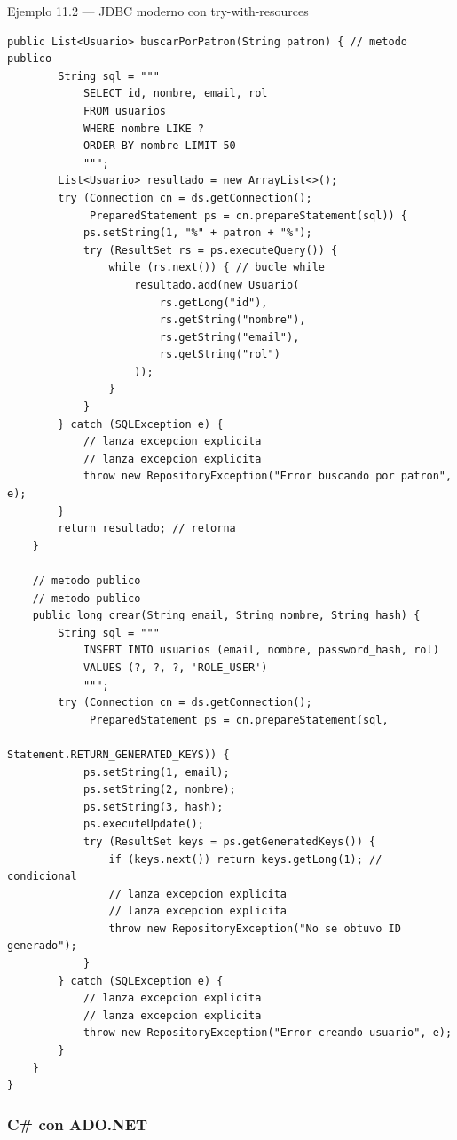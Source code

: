 \begin{cajaejemplo}{Ejemplo 11.2 --- JDBC moderno con try-with-resources}
\begin{lstlisting}[style=java,caption={UsuarioJdbcRepository.java},label=lst:11.5]
    public List<Usuario> buscarPorPatron(String patron) { // metodo publico
        String sql = """
            SELECT id, nombre, email, rol
            FROM usuarios
            WHERE nombre LIKE ?
            ORDER BY nombre LIMIT 50
            """;
        List<Usuario> resultado = new ArrayList<>();
        try (Connection cn = ds.getConnection();
             PreparedStatement ps = cn.prepareStatement(sql)) {
            ps.setString(1, "%" + patron + "%");
            try (ResultSet rs = ps.executeQuery()) {
                while (rs.next()) { // bucle while
                    resultado.add(new Usuario(
                        rs.getLong("id"),
                        rs.getString("nombre"),
                        rs.getString("email"),
                        rs.getString("rol")
                    ));
                }
            }
        } catch (SQLException e) {
            // lanza excepcion explicita
            // lanza excepcion explicita
            throw new RepositoryException("Error buscando por patron", e);
        }
        return resultado; // retorna
    }

    // metodo publico
    // metodo publico
    public long crear(String email, String nombre, String hash) {
        String sql = """
            INSERT INTO usuarios (email, nombre, password_hash, rol)
            VALUES (?, ?, ?, 'ROLE_USER')
            """;
        try (Connection cn = ds.getConnection();
             PreparedStatement ps = cn.prepareStatement(sql,
                                       Statement.RETURN_GENERATED_KEYS)) {
            ps.setString(1, email);
            ps.setString(2, nombre);
            ps.setString(3, hash);
            ps.executeUpdate();
            try (ResultSet keys = ps.getGeneratedKeys()) {
                if (keys.next()) return keys.getLong(1); // condicional
                // lanza excepcion explicita
                // lanza excepcion explicita
                throw new RepositoryException("No se obtuvo ID generado");
            }
        } catch (SQLException e) {
            // lanza excepcion explicita
            // lanza excepcion explicita
            throw new RepositoryException("Error creando usuario", e);
        }
    }
}
\end{lstlisting}
\end{cajaejemplo}

\subsubsection{C\# con ADO.NET}

